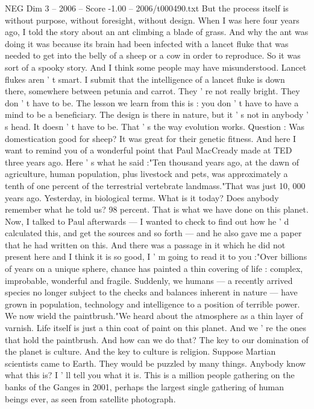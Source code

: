 \begin{textsample}{NEG Dim 3 – 2006 – Score -1.00 – 2006/t000490.txt}
But the process itself is without purpose, without foresight, without design.
When I was here four years ago, I told the story about an ant climbing a blade of grass.
And why the ant was doing it was because its brain had been infected with a lancet fluke that was needed to get into the belly of a sheep or a cow in order to reproduce.
So it was sort of a spooky story.
And I think some people may have misunderstood.
Lancet flukes aren ' t smart.
I submit that the intelligence of a lancet fluke is down there, somewhere between petunia and carrot.
They ' re not really bright.
They don ' t have to be.
The lesson we learn from this is : you don ' t have to have a mind to be a beneficiary.
The design is there in nature, but it ' s not in anybody ' s head.
It doesn ' t have to be.
That ' s the way evolution works.
Question : Was domestication good for sheep?
It was great for their genetic fitness.
And here I want to remind you of a wonderful point that Paul MacCready made at TED three years ago.
Here ' s what he said :"Ten thousand years ago, at the dawn of agriculture, human population, plus livestock and pets, was approximately a tenth of one percent of the terrestrial vertebrate landmass."That was just 10, 000 years ago.
Yesterday, in biological terms.
What is it today?
Does anybody remember what he told us? 98 percent.
That is what we have done on this planet.
Now, I talked to Paul afterwards — I wanted to check to find out how he ' d calculated this, and get the sources and so forth — and he also gave me a paper that he had written on this.
And there was a passage in it which he did not present here and I think it is so good, I ' m going to read it to you :"Over billions of years on a unique sphere, chance has painted a thin covering of life : complex, improbable, wonderful and fragile.
Suddenly, we humans — a recently arrived species no longer subject to the checks and balances inherent in nature — have grown in population, technology and intelligence to a position of terrible power.
We now wield the paintbrush."We heard about the atmosphere as a thin layer of varnish.
Life itself is just a thin coat of paint on this planet.
And we ' re the ones that hold the paintbrush.
And how can we do that?
The key to our domination of the planet is culture.
And the key to culture is religion.
Suppose Martian scientists came to Earth.
They would be puzzled by many things.
Anybody know what this is?
I ' ll tell you what it is.
This is a million people gathering on the banks of the Ganges in 2001, perhaps the largest single gathering of human beings ever, as seen from satellite photograph.

\end{textsample}
